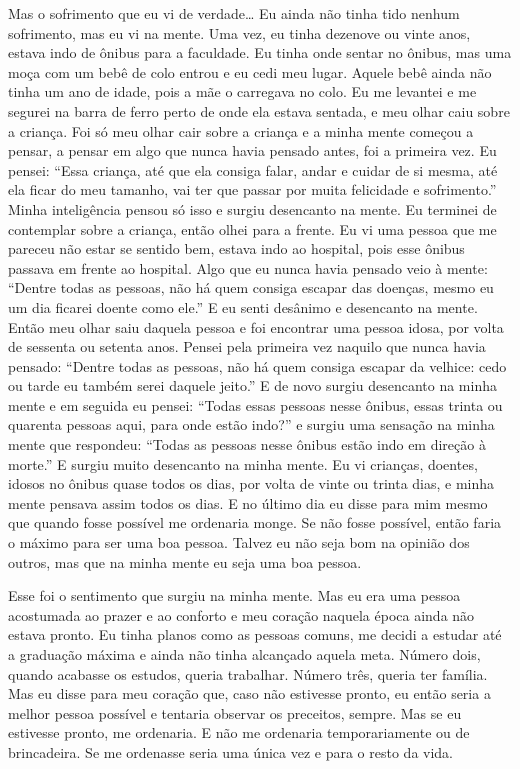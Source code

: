 Mas o sofrimento que eu vi de verdade… Eu ainda não tinha tido
nenhum sofrimento, mas eu vi na mente. Uma vez, eu tinha dezenove ou
vinte anos, estava indo de ônibus para a faculdade. Eu tinha onde
sentar no ônibus, mas uma moça com um bebê de colo entrou e eu cedi meu
lugar. Aquele bebê ainda não tinha um ano de idade, pois a mãe o
carregava no colo. Eu me levantei e me segurei na barra de ferro perto
de onde ela estava sentada, e meu olhar caiu sobre a criança. Foi só
meu olhar cair sobre a criança e a minha mente começou a pensar, a
pensar em algo que nunca havia pensado antes, foi a primeira vez. Eu
pensei: “Essa criança, até que ela consiga falar, andar e cuidar de si
mesma, até ela ficar do meu tamanho, vai ter que passar por muita
felicidade e sofrimento.” Minha inteligência pensou só isso e surgiu
desencanto na mente. Eu terminei de contemplar sobre a criança, então
olhei para a frente. Eu vi uma pessoa que me pareceu não estar se
sentido bem, estava indo ao hospital, pois esse ônibus passava em
frente ao hospital. Algo que eu nunca havia pensado veio à mente:
“Dentre todas as pessoas, não há quem consiga escapar das doenças,
mesmo eu um dia ficarei doente como ele.” E eu senti desânimo e
desencanto na mente. Então meu olhar saiu daquela pessoa e foi
encontrar uma pessoa idosa, por volta de sessenta ou setenta anos.
Pensei pela primeira vez naquilo que nunca havia pensado: “Dentre todas
as pessoas, não há quem consiga escapar da velhice: cedo ou tarde eu
também serei daquele jeito.” E de novo surgiu desencanto na minha mente
e em seguida eu pensei: “Todas essas pessoas nesse ônibus, essas trinta
ou quarenta pessoas aqui, para onde estão indo?” e surgiu uma sensação
na minha mente que respondeu: “Todas as pessoas nesse ônibus estão indo
em direção à morte.” E surgiu muito desencanto na minha mente. Eu vi
crianças, doentes, idosos no ônibus quase todos os dias, por volta de
vinte ou trinta dias, e minha mente pensava assim todos os dias. E no
último dia eu disse para mim mesmo que quando fosse possível me
ordenaria monge. Se não fosse possível, então faria o máximo para ser
uma boa pessoa. Talvez eu não seja bom na opinião dos outros, mas que
na minha mente eu seja uma boa pessoa.

Esse foi o sentimento que surgiu na minha mente. Mas eu era uma
pessoa acostumada ao prazer e ao conforto e meu coração naquela época
ainda não estava pronto. Eu tinha planos como as pessoas comuns, me
decidi a estudar até a graduação máxima e ainda não tinha alcançado
aquela meta. Número dois, quando acabasse os estudos, queria trabalhar.
Número três, queria ter família. Mas eu disse para meu coração que,
caso não estivesse pronto, eu então seria a melhor pessoa possível e
tentaria observar os preceitos, sempre. Mas se eu estivesse pronto, me
ordenaria. E não me ordenaria temporariamente ou de brincadeira. Se me
ordenasse seria uma única vez e para o resto da vida.

